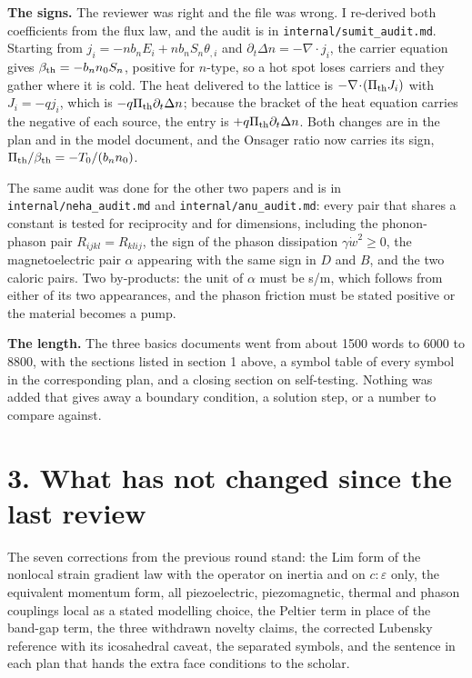\documentclass[11pt]{article}
\begin{document}
\textbf{The signs.} The reviewer was right and the file was wrong. I re-derived both coefficients from the
flux law, and the audit is in \texttt{internal/sumit\_audit.md}. Starting from
$j_i=-n b_nE_i+n b_nS_n\theta_{,i}$ and $\partial_t\Delta n=-\nabla\!\cdot\!j_i$, the carrier equation gives
$\beta_{\rm th}=-b_nn_0S_n$, positive for $n$-type, so a hot spot loses carriers and they gather where it is
cold. The heat delivered to the lattice is $-\nabla\!\cdot\!(\Pi_{\rm th}J_i)$ with $J_i=-qj_i$, which is
$-q\Pi_{\rm th}\partial_t\Delta n$; because the bracket of the heat equation carries the negative of each
source, the entry is $+q\Pi_{\rm th}\partial_t\Delta n$. Both changes are in the plan and in the model
document, and the Onsager ratio now carries its sign, $\Pi_{\rm th}/\beta_{\rm th}=-T_0/(b_nn_0)$.

The same audit was done for the other two papers and is in \texttt{internal/neha\_audit.md} and
\texttt{internal/anu\_audit.md}: every pair that shares a constant is tested for reciprocity and for
dimensions, including the phonon-phason pair $R_{ijkl}=R_{klij}$, the sign of the phason dissipation
$\gamma\dot w^2\ge0$, the magnetoelectric pair $\alpha$ appearing with the same sign in $D$ and $B$, and the
two caloric pairs. Two by-products: the unit of $\alpha$ must be s/m, which follows from either of its two
appearances, and the phason friction must be stated positive or the material becomes a pump.

\textbf{The length.} The three basics documents went from about 1500 words to 6000 to 8800, with the sections
listed in section 1 above, a symbol table of every symbol in the corresponding plan, and a closing section on
self-testing. Nothing was added that gives away a boundary condition, a solution step, or a number to compare
against.

\section*{3. What has not changed since the last review}

The seven corrections from the previous round stand: the Lim form of the nonlocal strain gradient law with the
operator on inertia and on $c{:}\varepsilon$ only, the equivalent momentum form, all piezoelectric,
piezomagnetic, thermal and phason couplings local as a stated modelling choice, the Peltier term in place of
the band-gap term, the three withdrawn novelty claims, the corrected Lubensky reference with its icosahedral
caveat, the separated symbols, and the sentence in each plan that hands the extra face conditions to the
scholar.
\end{document}
